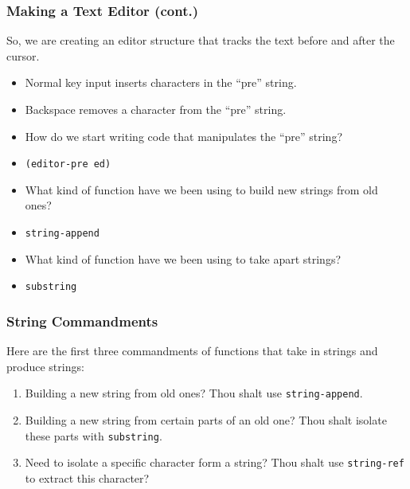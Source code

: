 \documentclass{beamer}
\begin{document}
\begin{frame}
  \frametitle{Making a Text Editor (cont.)}
  So, we are creating an editor structure that tracks
  the text before and after the cursor.
  \begin{itemize}
  \item<2-> Normal key input inserts characters in the ``pre'' string.
  \item<3-> Backspace removes a character from the ``pre'' string.
  \item<4-> How do we start writing code that manipulates the ``pre'' string?
  \item<5-> \texttt{(editor-pre ed)}
  \item<6-> What kind of function have we been using to build new strings
    from old ones?
  \item<7-> \texttt{string-append}
  \item<8-> What kind of function have we been using to take apart strings?
  \item<9-> \texttt{substring}
  \end{itemize}
\end{frame}

\begin{frame}
  \frametitle{String Commandments}
  Here are the first three commandments of functions that take in
  strings and produce strings:
  \begin{enumerate}
  \item<2-> Building a new string from old ones? Thou shalt use \texttt{string-append}.
  \item<3-> Building a new string from certain parts of an old one? Thou shalt
    isolate these parts with \texttt{substring}.
  \item<4-> Need to isolate a specific character form a string? Thou shalt use
    \texttt{string-ref} to extract this character?
  \end{enumerate}
\end{frame}

\end{document}
